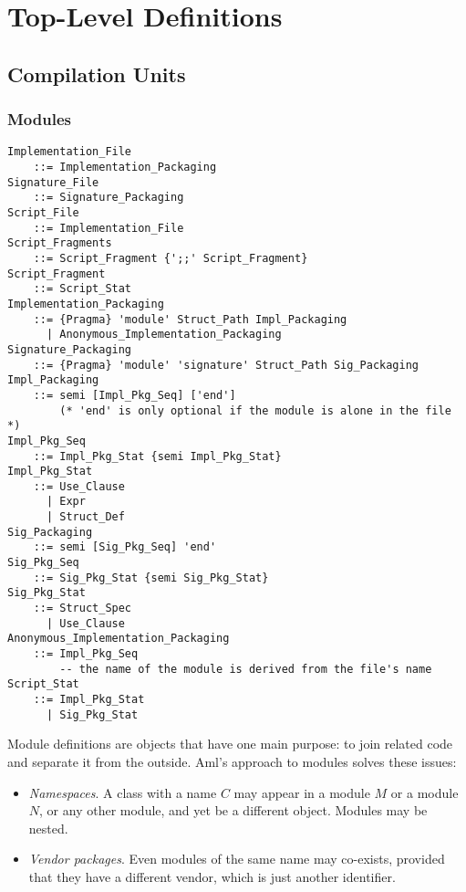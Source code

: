 
\chapter{Top-Level Definitions}

\minitoc

\newpage

\section{Compilation Units}
\label{sec:compilation-units}

\subsection{Modules}
\label{sec:modules}

\grammar\begin{lstlisting}
Implementation_File
    ::= Implementation_Packaging
Signature_File
    ::= Signature_Packaging
Script_File
    ::= Implementation_File
Script_Fragments
    ::= Script_Fragment {';;' Script_Fragment}
Script_Fragment
    ::= Script_Stat
Implementation_Packaging 
    ::= {Pragma} 'module' Struct_Path Impl_Packaging
      | Anonymous_Implementation_Packaging
Signature_Packaging
    ::= {Pragma} 'module' 'signature' Struct_Path Sig_Packaging
Impl_Packaging
    ::= semi [Impl_Pkg_Seq] ['end']  
        (* 'end' is only optional if the module is alone in the file *)
Impl_Pkg_Seq
    ::= Impl_Pkg_Stat {semi Impl_Pkg_Stat}
Impl_Pkg_Stat 
    ::= Use_Clause
      | Expr
      | Struct_Def
Sig_Packaging
    ::= semi [Sig_Pkg_Seq] 'end'
Sig_Pkg_Seq 
    ::= Sig_Pkg_Stat {semi Sig_Pkg_Stat}
Sig_Pkg_Stat
    ::= Struct_Spec
      | Use_Clause
Anonymous_Implementation_Packaging
    ::= Impl_Pkg_Seq
        -- the name of the module is derived from the file's name
Script_Stat
    ::= Impl_Pkg_Stat
      | Sig_Pkg_Stat
\end{lstlisting}

Module definitions are objects that have one main purpose: to join related code and separate it from the outside. Aml's approach to modules solves these issues: 
\begin{itemize}
  \item {\em Namespaces}. A class with a name $C$ may appear in a module $M$ or a module $N$, or any other module, and yet be a different object. Modules may be nested.
  \item {\em Vendor packages}. Even modules of the same name may co-exists, provided that they have a different vendor, which is just another identifier. 
\end{itemize}

